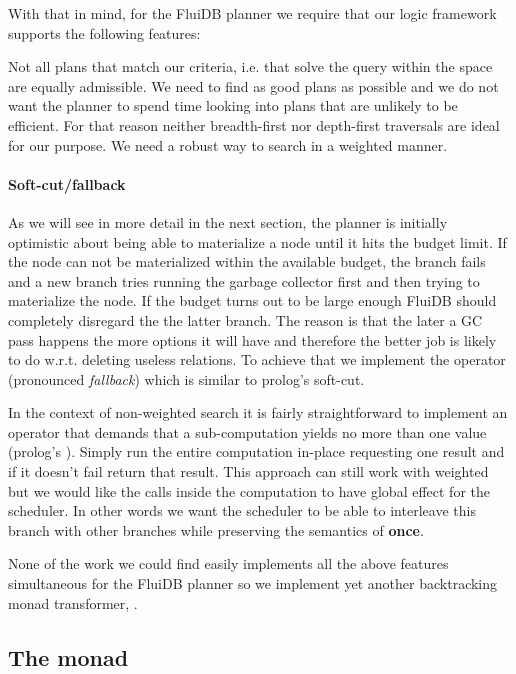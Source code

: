 With that in mind, for the FluiDB planner we require that our logic
framework supports the following features:

Not all plans that match our criteria, i.e. that
solve the query within the space are equally admissible. We need to
find as good plans as possible and we do not want the planner to spend
time looking into plans that are unlikely to be efficient. For that
reason neither breadth-first nor depth-first traversals are ideal for
our purpose. We need a robust way to search in a weighted manner.

\paragraph{Soft-cut/fallback} 
As we will see in more detail in the next section,
the planner is initially optimistic about being able to materialize a
node until it hits the budget limit. If the node can not be materialized
within the available budget, the branch fails and a new branch tries running 
the garbage collector first and then trying to materialize the node.
If the budget turns out to be large enough FluiDB should completely disregard the the latter branch. 
The reason is that the later a GC pass happens the more options it will have and therefore the
better job is likely to do w.r.t. deleting useless relations.
To achieve that we implement the operator
\hask{<//>} (pronounced \emph{fallback}) which is similar to prolog's soft-cut.

In the context of non-weighted search it is fairly
straightforward to implement an operator that demands that a sub-computation yields no more than
one value (prolog's ). Simply run the entire computation
in-place requesting one result and if it doesn't fail return that
result. This approach can still work with weighted but we would like
the  calls inside the computation to have global effect for the
scheduler. In other words we want the scheduler to be able to
interleave this branch with other branches while preserving the
semantics of \textbf{once}.

None of the work we could find easily implements all the above
features simultaneous for the FluiDB planner so we implement yet
another backtracking monad transformer, .

\subsection{The  monad}

